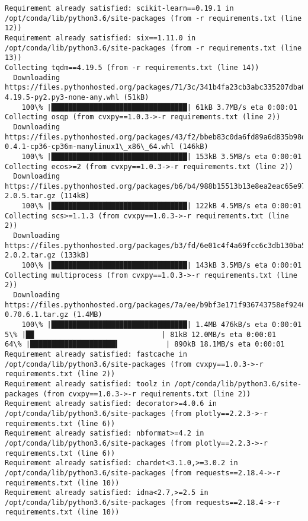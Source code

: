\documentclass[11pt]{article}
\begin{document}
\begin{Verbatim}[commandchars=\\\{\}]
Requirement already satisfied: scikit-learn==0.19.1 in /opt/conda/lib/python3.6/site-packages (from -r requirements.txt (line 12))
Requirement already satisfied: six==1.11.0 in /opt/conda/lib/python3.6/site-packages (from -r requirements.txt (line 13))
Collecting tqdm==4.19.5 (from -r requirements.txt (line 14))
  Downloading https://files.pythonhosted.org/packages/71/3c/341b4fa23cb3abc335207dba057c790f3bb329f6757e1fcd5d347bcf8308/tqdm-4.19.5-py2.py3-none-any.whl (51kB)
    100\% |████████████████████████████████| 61kB 3.7MB/s eta 0:00:01
Collecting osqp (from cvxpy==1.0.3->-r requirements.txt (line 2))
  Downloading https://files.pythonhosted.org/packages/43/f2/bbeb83c0da6fd89a6d835b98d85ec76c04f39a476c065e3c99b6b709c493/osqp-0.4.1-cp36-cp36m-manylinux1\_x86\_64.whl (146kB)
    100\% |████████████████████████████████| 153kB 3.5MB/s eta 0:00:01
Collecting ecos>=2 (from cvxpy==1.0.3->-r requirements.txt (line 2))
  Downloading https://files.pythonhosted.org/packages/b6/b4/988b15513b13e8ea2eac65e97d84221ac515a735a93f046e2a2a3d7863fc/ecos-2.0.5.tar.gz (114kB)
    100\% |████████████████████████████████| 122kB 4.5MB/s eta 0:00:01
Collecting scs>=1.1.3 (from cvxpy==1.0.3->-r requirements.txt (line 2))
  Downloading https://files.pythonhosted.org/packages/b3/fd/6e01c4f4a69fcc6c3db130ba55572089e78e77ea8c0921a679f9da1ec04c/scs-2.0.2.tar.gz (133kB)
    100\% |████████████████████████████████| 143kB 3.5MB/s eta 0:00:01
Collecting multiprocess (from cvxpy==1.0.3->-r requirements.txt (line 2))
  Downloading https://files.pythonhosted.org/packages/7a/ee/b9bf3e171f936743758ef924622d8dd00516c5532b00a1210a09bce68325/multiprocess-0.70.6.1.tar.gz (1.4MB)
    100\% |████████████████████████████████| 1.4MB 476kB/s eta 0:00:01  5\% |█▉                              | 81kB 12.0MB/s eta 0:00:01    64\% |████████████████████▌           | 890kB 18.1MB/s eta 0:00:01
Requirement already satisfied: fastcache in /opt/conda/lib/python3.6/site-packages (from cvxpy==1.0.3->-r requirements.txt (line 2))
Requirement already satisfied: toolz in /opt/conda/lib/python3.6/site-packages (from cvxpy==1.0.3->-r requirements.txt (line 2))
Requirement already satisfied: decorator>=4.0.6 in /opt/conda/lib/python3.6/site-packages (from plotly==2.2.3->-r requirements.txt (line 6))
Requirement already satisfied: nbformat>=4.2 in /opt/conda/lib/python3.6/site-packages (from plotly==2.2.3->-r requirements.txt (line 6))
Requirement already satisfied: chardet<3.1.0,>=3.0.2 in /opt/conda/lib/python3.6/site-packages (from requests==2.18.4->-r requirements.txt (line 10))
Requirement already satisfied: idna<2.7,>=2.5 in /opt/conda/lib/python3.6/site-packages (from requests==2.18.4->-r requirements.txt (line 10))

\end{Verbatim}
\end{document}
